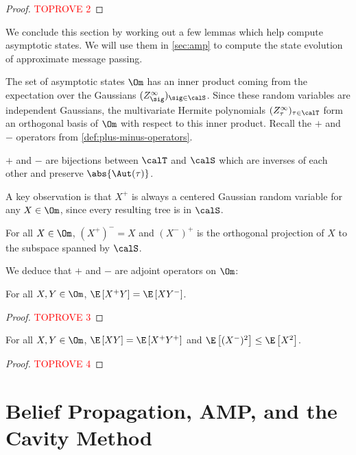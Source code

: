 \documentclass[12pt]{article}
\begin{document}
\begin{proof}\textcolor{red}{TOPROVE 2}\end{proof}



We conclude this section by working out a few lemmas which help compute asymptotic
states.
We will use them in \cref{sec:amp} to compute
the state evolution of approximate
message passing.

The set of asymptotic states $\Om$ has an inner product coming from the expectation over the Gaussians $(Z_\sig^\infty)_{\sig \in \calS}$.
Since these random variables are independent Gaussians, the multivariate Hermite polynomials $(Z^\infty_\tau)_{\tau\in\calT}$ form an orthogonal basis of $\Om$ with respect to this inner product. Recall the $+$ and $-$ operators
from \cref{def:plus-minus-operators}.

\begin{fact}\label{lem:bijection}
    $+$ and $-$ are bijections between $\calT$ and $\calS$ which are inverses of each other and
    preserve $\abs{\Aut(\tau)}$.
\end{fact}
A key observation is that $X^+$ is always a centered Gaussian random variable for any $X \in \Om$,
since every resulting tree is in $\calS$.

\begin{fact}\label{cor:pm-cancel}
    For all $X \in \Om$, $(X^+)^- = X$ and $(X^-)^+$ is the orthogonal projection
    of $X$ to the subspace spanned by $\calS$.
\end{fact}

We deduce that $+$ and $-$ are adjoint operators on $\Om$:

\begin{lemma}\label{lem:adjoint}
    For all $X, Y \in \Om$,
    $\E\left[X^+Y\right] = \E\left[XY^-\right]$.
\end{lemma}
\begin{proof}\textcolor{red}{TOPROVE 3}\end{proof}


\begin{lemma}\label{cor:adjoint}
    For all $X, Y \in \Om$,
    $\E\left[XY\right] = \E\left[X^+Y^+\right]$ and $\E\left[(X^-)^2\right] \leq \E\left[X^2\right]$.
\end{lemma}
\begin{proof}\textcolor{red}{TOPROVE 4}\end{proof}




\section{Belief Propagation, AMP, and the Cavity Method}
\label{sec:cavity-method}
\end{document}
